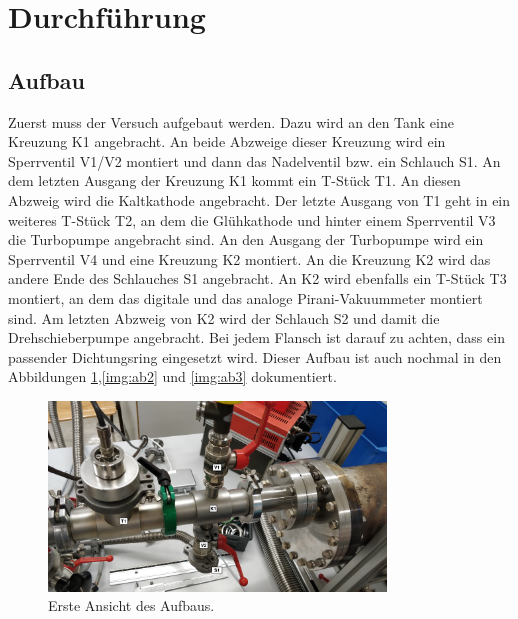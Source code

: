 \section{Durchführung}
\label{sec:Durchführung}
\subsection{Aufbau}
Zuerst muss der Versuch aufgebaut werden. Dazu wird an den Tank eine Kreuzung K1 angebracht. An beide Abzweige dieser Kreuzung wird ein Sperrventil V1/V2
montiert und dann das Nadelventil bzw. ein Schlauch S1. An dem letzten Ausgang der Kreuzung K1 kommt ein T-Stück T1. An diesen Abzweig wird die Kaltkathode
angebracht. Der letzte Ausgang von T1 geht in ein weiteres T-Stück T2, an dem die Glühkathode und hinter einem Sperrventil V3 die Turbopumpe angebracht sind.
An den Ausgang der Turbopumpe wird ein Sperrventil V4 und eine Kreuzung K2 montiert. An die Kreuzung K2 wird das andere Ende des Schlauches S1 angebracht. An K2
wird ebenfalls ein T-Stück T3 montiert, an dem das digitale und das analoge Pirani-Vakuummeter montiert sind. Am letzten Abzweig von K2 wird der Schlauch S2 und
damit die Drehschieberpumpe angebracht. Bei jedem Flansch ist darauf zu achten, dass ein passender Dichtungsring eingesetzt wird. Dieser Aufbau ist auch
nochmal in den Abbildungen \ref{img:ab1},\ref{img:ab2} und \ref{img:ab3} dokumentiert.
\begin{figure}
	\centering
	\includegraphics[width=0.8\textwidth]{img/Aufbau1.jpg}
	\caption{Erste Ansicht des Aufbaus.}
	\label{img:ab1}
\end{figure}
